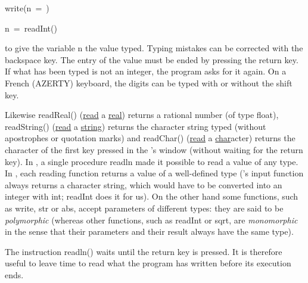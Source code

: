 \mbox{\blc  \blk\blk\idt  write({\cha {}n\ =\ })}\par
\mbox{\blc  \blk\blk\idt  n\ =\ readInt()}\par

\noindent to give the variable {\idt n} the value typed. Typing
mistakes can be corrected with the  %
\framebox[11.mm][l]{$\leftarrow$~~~}\hspace{0.3ex}
backspace key. The entry of the value must be ended by pressing the %
\framebox[11.mm][l]{$\hookleftarrow$~~~}\hspace{0.3ex}
return key. If what has been typed is not an integer, the program asks for it
again. On a French (AZERTY) keyboard, the digits can be typed with or without the
shift key.

Likewise {\idt readReal()} (\underline{read} a \underline{real}) returns a rational number (of type {\idt float}), {\idt readString()}
(\underline{read} a \underline{string}) returns the character string typed (without apostrophes or quotation marks) and {\idt readChar()} (\underline{read} a \underline{char}acter) returns
the character of the first key pressed in the \robot's window (without waiting for the
return key). In \pascal, a single procedure {\idt readln} made it possible to read a value
of any type. In \python, each reading function returns a value of a well-defined type
(\python's {\idt input} function always returns a character string, which would have to be
converted into an integer with {\idt int}; {\idt readInt} does it for us). On the other hand some
functions, such as {\idt write}, {\idt str} or {\idt abs}, accept parameters of different
types: they are said to be {\em polymorphic} (whereas other functions, such as
{\idt readInt} or {\idt sqrt}, are {\em monomorphic} in the sense that their
parameters and their result always have the same type).

The instruction {\idt readln()} waits until the %
\framebox[11.mm][l]{$\hookleftarrow$~~~}\hspace{0.3ex}
return key is pressed. It is therefore useful to leave time to read what
the program has written before its execution ends.

